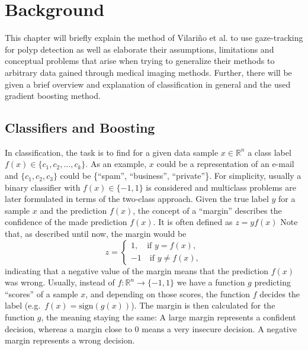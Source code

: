 \chapter{Background}
\label{chap:background}
This chapter will briefly explain the method of Vilari\~no et al. to use gaze-tracking for polyp detection as well as elaborate their assumptions, limitations and conceptual problems that arise when trying to generalize their methods to arbitrary data gained through medical imaging methods. Further, there will be given a brief overview and explanation of classification in general and the used gradient boosting method.

\section{Classifiers and Boosting}
In classification, the task is to find for a given data sample $x \in \mathbb{R}^n$ a class label $f(x) \in \{c_1, c_2, ..., c_k\}$. As an example, $x$ could be a representation of an e-mail and $\{c_1,c_2,c_3\}$ could be \{``spam'', ``business'', ``private''\}. For simplicity, usually a binary classifier with $f(x) \in \{-1,1\}$ is considered and multiclass problems are later formulated in terms of the two-class approach. 
Given the true label $y$ for a sample $x$ and the prediction $f(x)$, the concept of a ``margin'' describes the confidence of the made prediction $f(x).$ It is often defined as $z = y f(x)$
Note that, as described until now, the margin would be
\begin{equation*}
z = 
     \begin{cases}
	1, \quad \text{if } y = f(x), \\
	-1 \quad \text{if } y \neq f(x),
      \end{cases}
\end{equation*}
indicating that a negative value of the margin means that the prediction $f(x)$ was wrong. Usually, instead of $f: \mathbb{R}^n \longrightarrow \{-1,1\}$ we have a function $g$ predicting ``scores'' of a sample $x$, and depending on those scores, the function $f$ decides the label (e.g.\ $f(x) = \text{sign}(g(x))$). The margin is then calculated for the function $g$, the meaning staying the same: A large margin represents a confident decision, whereas a margin close to $0$ means a very insecure decision. A negative margin represents a wrong decision.

